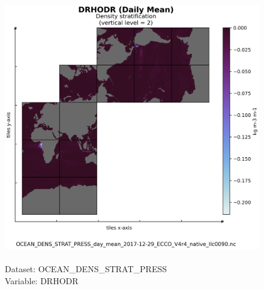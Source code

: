 \begin{figure}[H]
\centering
\includegraphics[scale=0.5]{../images/plots/native_plots/Ocean_Density_Stratification_and_Hydrostatic_Pressure/DRHODR.png}
\caption{\\Dataset: OCEAN\_DENS\_STRAT\_PRESS\\Variable: DRHODR}
\label{tab:table-OCEAN_DENS_STRAT_PRESS_DRHODR-Plot}
\end{figure}
\pagebreak
